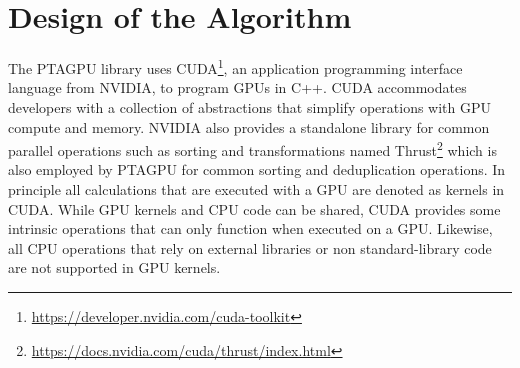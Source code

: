 \section{Design of the Algorithm}\label{sec:design}
The PTAGPU library uses CUDA\footnote{\url{https://developer.nvidia.com/cuda-toolkit}}, an application programming interface language from NVIDIA, to program GPUs in C++.
CUDA accommodates developers with a collection of abstractions that simplify operations with GPU compute and memory. NVIDIA also provides a standalone library for common parallel operations such as sorting and transformations named Thrust\footnote{\url{https://docs.nvidia.com/cuda/thrust/index.html}} which is also employed by PTAGPU for common sorting and deduplication operations.
In principle all calculations that are executed with a GPU are denoted as kernels in CUDA. While GPU kernels and CPU code can be shared, CUDA provides some intrinsic operations that can only function when executed on a GPU.
Likewise, all CPU operations that rely on external libraries or non standard-library code are not supported in GPU kernels.

